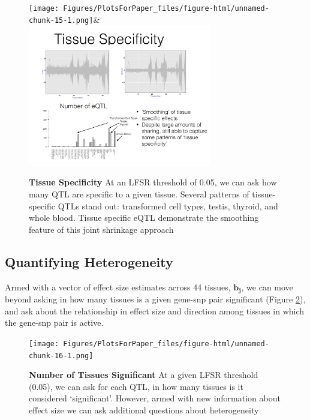 \newline
\begin{figure}[htbp]
\begin{center}
\texttt{[image: Figures/PlotsForPaper\_files/figure-html/unnamed-chunk-15-1.png]}&
\includegraphics[width=8cm]{Figures/tspecsmooth.pdf}
\end{center}
\caption{\textbf{Tissue Specificity} At an LFSR threshold of 0.05, we can ask how many QTL are specific to a given tissue. Several patterns of tissue-specific QTLs stand out: transformed cell types, testis, thyroid, and whole blood. Tissue specific eQTL demonstrate the smoothing feature of this joint shrinkage approach}
\label{fig:tspec}
\end{figure}\newline




\subsection{Quantifying Heterogeneity}


Armed with a vector of effect size estimates across 44 tissues, $\bm{b_{j}}$, we can move beyond asking in how many tissues is a given gene-snp pair significant (Figure \ref{fig:numsig}), and ask about the relationship in effect size and direction among tissues in which the gene-snp pair is active.


\newline
\begin{figure}[htbp]
\texttt{[image: Figures/PlotsForPaper\_files/figure-html/unnamed-chunk-16-1.png]}\\
\caption{\textbf{Number of Tissues Significant} At a given LFSR threshold (0.05), we can ask for each QTL, in how many tissues is it considered `significant'. However, armed with new information about effect size we can ask additional questions about heterogeneity}
\label{fig:numsig}
\end{figure}\newline

